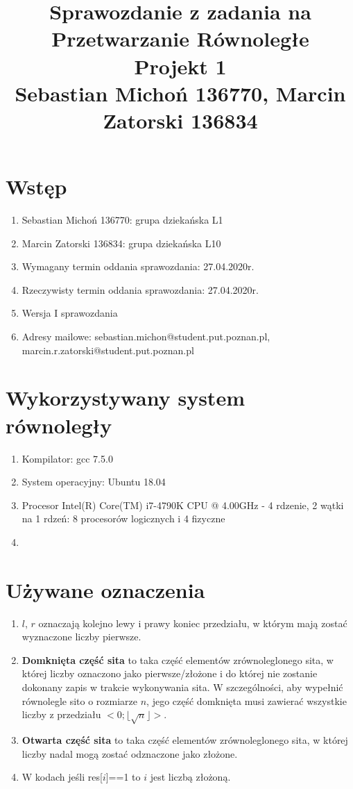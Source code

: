 \documentclass[12pt]{article}
\begin{document}
\title{Sprawozdanie z zadania na Przetwarzanie Równoległe\\
\large Projekt 1\\
\large Sebastian Michoń 136770, Marcin Zatorski 136834}
\date{\vspace{-10ex}}
\maketitle

\section{Wstęp}
\begin {enumerate}
\item Sebastian Michoń 136770: grupa dziekańska L1
\item Marcin Zatorski 136834: grupa dziekańska L10
\item Wymagany termin oddania sprawozdania: 27.04.2020r.
\item Rzeczywisty termin oddania sprawozdania: 27.04.2020r.
\item Wersja I sprawozdania
\item Adresy mailowe: sebastian.michon@student.put.poznan.pl, marcin.r.zatorski@student.put.poznan.pl
\end {enumerate}

\section{Wykorzystywany system równoległy}
\begin {enumerate}
	\item Kompilator: gcc 7.5.0
	\item System operacyjny: Ubuntu 18.04
	\item Procesor Intel(R) Core(TM) i7-4790K CPU @ 4.00GHz - 4 rdzenie, 2 wątki na 1 rdzeń: 8 procesorów logicznych i 4 fizyczne
	\item 
	
\end {enumerate}

\section{Używane oznaczenia}
\begin{enumerate}
	\item \(l\), \(r\) oznaczają kolejno lewy i prawy koniec przedziału, w którym mają zostać wyznaczone liczby pierwsze.
	\item \textbf{Domknięta część sita} to taka część elementów zrównoleglonego sita, w której liczby oznaczono jako pierwsze/złożone i do której nie zostanie dokonany zapis w trakcie wykonywania sita. W szczególności, aby wypełnić równolegle sito o rozmiarze \(n\), jego część domknięta musi zawierać wszystkie liczby z przedziału \(<0;\lfloor\sqrt{n}\rfloor>\).
	\item \textbf{Otwarta część sita} to taka część elementów zrównoleglonego sita, w której liczby nadal mogą zostać odznaczone jako złożone.
	\item W kodach jeśli res[\(i\)]==1 to \(i\) jest liczbą złożoną.
\end{enumerate}
\end{document}
